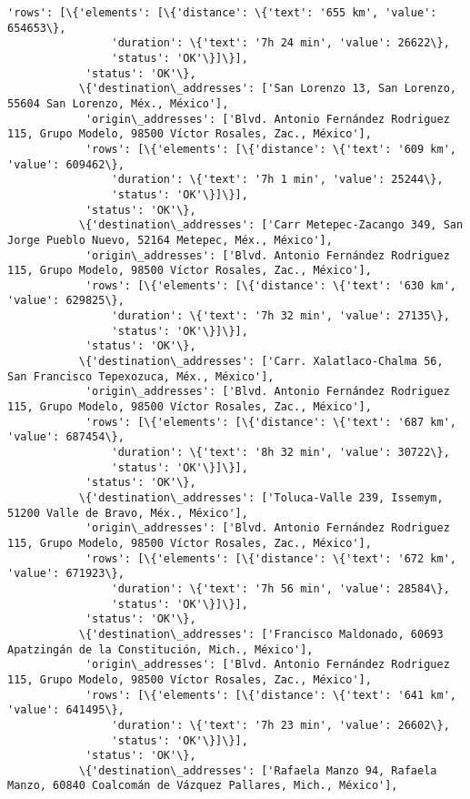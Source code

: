 \documentclass[11pt]{article}
\begin{document}
\begin{Verbatim}[commandchars=\\\{\}]
            'rows': [\{'elements': [\{'distance': \{'text': '655 km', 'value': 654653\},
                'duration': \{'text': '7h 24 min', 'value': 26622\},
                'status': 'OK'\}]\}],
            'status': 'OK'\},
           \{'destination\_addresses': ['San Lorenzo 13, San Lorenzo, 55604 San Lorenzo, Méx., México'],
            'origin\_addresses': ['Blvd. Antonio Fernández Rodriguez 115, Grupo Modelo, 98500 Víctor Rosales, Zac., México'],
            'rows': [\{'elements': [\{'distance': \{'text': '609 km', 'value': 609462\},
                'duration': \{'text': '7h 1 min', 'value': 25244\},
                'status': 'OK'\}]\}],
            'status': 'OK'\},
           \{'destination\_addresses': ['Carr Metepec-Zacango 349, San Jorge Pueblo Nuevo, 52164 Metepec, Méx., México'],
            'origin\_addresses': ['Blvd. Antonio Fernández Rodriguez 115, Grupo Modelo, 98500 Víctor Rosales, Zac., México'],
            'rows': [\{'elements': [\{'distance': \{'text': '630 km', 'value': 629825\},
                'duration': \{'text': '7h 32 min', 'value': 27135\},
                'status': 'OK'\}]\}],
            'status': 'OK'\},
           \{'destination\_addresses': ['Carr. Xalatlaco-Chalma 56, San Francisco Tepexozuca, Méx., México'],
            'origin\_addresses': ['Blvd. Antonio Fernández Rodriguez 115, Grupo Modelo, 98500 Víctor Rosales, Zac., México'],
            'rows': [\{'elements': [\{'distance': \{'text': '687 km', 'value': 687454\},
                'duration': \{'text': '8h 32 min', 'value': 30722\},
                'status': 'OK'\}]\}],
            'status': 'OK'\},
           \{'destination\_addresses': ['Toluca-Valle 239, Issemym, 51200 Valle de Bravo, Méx., México'],
            'origin\_addresses': ['Blvd. Antonio Fernández Rodriguez 115, Grupo Modelo, 98500 Víctor Rosales, Zac., México'],
            'rows': [\{'elements': [\{'distance': \{'text': '672 km', 'value': 671923\},
                'duration': \{'text': '7h 56 min', 'value': 28584\},
                'status': 'OK'\}]\}],
            'status': 'OK'\},
           \{'destination\_addresses': ['Francisco Maldonado, 60693 Apatzingán de la Constitución, Mich., México'],
            'origin\_addresses': ['Blvd. Antonio Fernández Rodriguez 115, Grupo Modelo, 98500 Víctor Rosales, Zac., México'],
            'rows': [\{'elements': [\{'distance': \{'text': '641 km', 'value': 641495\},
                'duration': \{'text': '7h 23 min', 'value': 26602\},
                'status': 'OK'\}]\}],
            'status': 'OK'\},
           \{'destination\_addresses': ['Rafaela Manzo 94, Rafaela Manzo, 60840 Coalcomán de Vázquez Pallares, Mich., México'],

\end{Verbatim}
\end{document}
